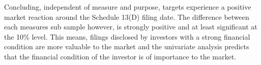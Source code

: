 \documentclass[12pt]{article}
\begin{document}
Concluding, independent of measure and purpose, targets experience a positive market reaction around the Schedule 13(D) filing date. The difference between each measures sub sample however, is strongly positive and at least significant at the 10\% level. 
This means, filings disclosed by investors with a strong financial condition are more valuable to the market and the univariate analysis predicts that the financial condition of the investor is of importance to the market. 




\end{document}
